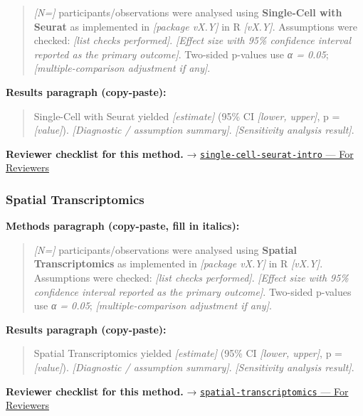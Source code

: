 \documentclass[
]{article}
\begin{document}
\begin{quote}
\emph{{[}N={]}} participants/observations were analysed using
\textbf{Single-Cell with Seurat} as implemented in \emph{{[}package
vX.Y{]}} in R \emph{{[}vX.Y{]}}. Assumptions were checked: \emph{{[}list
checks performed{]}}. \emph{{[}Effect size with 95\% confidence interval
reported as the primary outcome{]}}. Two-sided p-values use \emph{α =
0.05}; \emph{{[}multiple-comparison adjustment if any{]}}.
\end{quote}

\textbf{Results paragraph (copy-paste):}

\begin{quote}
Single-Cell with Seurat yielded \emph{{[}estimate{]}} (95\% CI
\emph{{[}lower, upper{]}}, p = \emph{{[}value{]}}). \emph{{[}Diagnostic
/ assumption summary{]}}. \emph{{[}Sensitivity analysis result{]}}.
\end{quote}

\textbf{Reviewer checklist for this method.} →
\href{../chapters/12-bioinformatics/single-cell-seurat-intro.Rmd\#for-reviewers}{\texttt{single-cell-seurat-intro}
--- For Reviewers}

\subsubsection{Spatial Transcriptomics}\label{spatial-transcriptomics}

\textbf{Methods paragraph (copy-paste, fill in italics):}

\begin{quote}
\emph{{[}N={]}} participants/observations were analysed using
\textbf{Spatial Transcriptomics} as implemented in \emph{{[}package
vX.Y{]}} in R \emph{{[}vX.Y{]}}. Assumptions were checked: \emph{{[}list
checks performed{]}}. \emph{{[}Effect size with 95\% confidence interval
reported as the primary outcome{]}}. Two-sided p-values use \emph{α =
0.05}; \emph{{[}multiple-comparison adjustment if any{]}}.
\end{quote}

\textbf{Results paragraph (copy-paste):}

\begin{quote}
Spatial Transcriptomics yielded \emph{{[}estimate{]}} (95\% CI
\emph{{[}lower, upper{]}}, p = \emph{{[}value{]}}). \emph{{[}Diagnostic
/ assumption summary{]}}. \emph{{[}Sensitivity analysis result{]}}.
\end{quote}

\textbf{Reviewer checklist for this method.} →
\href{../chapters/12-bioinformatics/spatial-transcriptomics.Rmd\#for-reviewers}{\texttt{spatial-transcriptomics}
--- For Reviewers}
\end{document}
